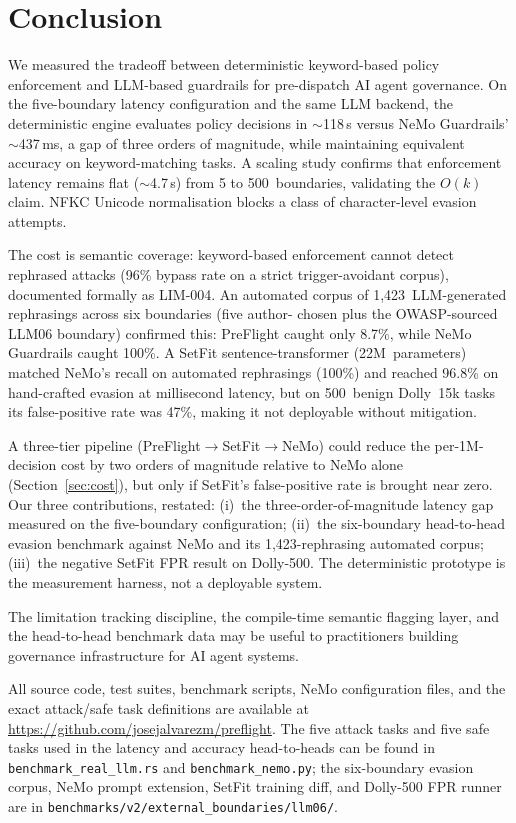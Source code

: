 \documentclass[11pt,a4paper]{article}
\begin{document}
\section{Conclusion}
\label{sec:conclusion}

We measured the tradeoff between deterministic keyword-based policy
enforcement and LLM-based guardrails for pre-dispatch AI agent governance.
On the five-boundary latency configuration and the same LLM backend, the
deterministic engine evaluates policy decisions in $\sim$118\,\textmu s
versus NeMo Guardrails' $\sim$437\,ms, a gap of three orders of
magnitude, while maintaining equivalent accuracy on keyword-matching
tasks.
A scaling study confirms that enforcement latency remains flat
($\sim$4.7\,\textmu s) from 5 to 500~boundaries, validating the $O(k)$
claim. NFKC Unicode normalisation blocks a class of character-level
evasion attempts.

The cost is semantic coverage: keyword-based enforcement cannot detect
rephrased attacks (96\% bypass rate on a strict trigger-avoidant corpus),
documented formally as LIM-004. An automated corpus of
1{,}423~LLM-generated rephrasings across six boundaries (five author-
chosen plus the OWASP-sourced LLM06 boundary) confirmed this:
PreFlight caught only
8.7\%, while NeMo Guardrails caught 100\%. A SetFit
sentence-transformer (22M~parameters) matched NeMo's recall on automated
rephrasings (100\%) and reached 96.8\% on hand-crafted evasion at
millisecond latency, but on 500~benign Dolly~15k tasks its
false-positive rate was 47\%, making it not deployable without
mitigation.

A three-tier pipeline (PreFlight$\to$SetFit$\to$NeMo) could reduce the
per-1M-decision cost by two orders of magnitude relative to NeMo alone
(Section~\ref{sec:cost}), but only if SetFit's false-positive rate is
brought near zero. Our three contributions, restated: (i)~the
three-order-of-magnitude latency gap measured on the five-boundary
configuration; (ii)~the six-boundary head-to-head evasion benchmark
against NeMo and its 1{,}423-rephrasing automated corpus; (iii)~the
negative SetFit FPR result on Dolly-500. The deterministic prototype is
the measurement harness, not a deployable system.

The limitation tracking discipline, the compile-time semantic
flagging layer, and the head-to-head benchmark data may be useful
to practitioners building governance infrastructure for AI agent systems.

All source code, test suites, benchmark scripts, NeMo configuration
files, and the exact attack/safe task definitions are available at
\url{https://github.com/josejalvarezm/preflight}.
The five attack tasks and five safe tasks used in the latency and
accuracy head-to-heads can be found in \texttt{benchmark\_real\_llm.rs}
and \texttt{benchmark\_nemo.py}; the six-boundary evasion corpus,
NeMo prompt extension, SetFit training diff, and Dolly-500 FPR runner
are in \texttt{benchmarks/v2/external\_boundaries/llm06/}.
\end{document}
